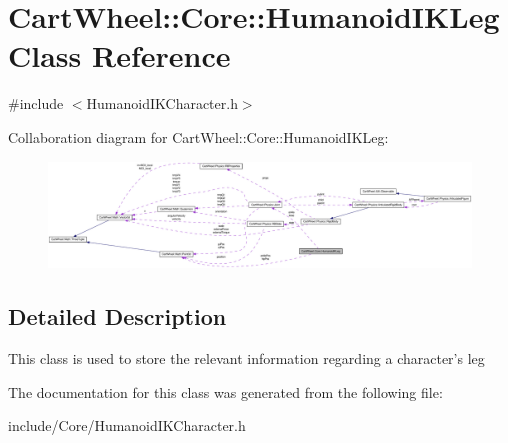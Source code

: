 \hypertarget{classCartWheel_1_1Core_1_1HumanoidIKLeg}{
\section{CartWheel::Core::HumanoidIKLeg Class Reference}
\label{classCartWheel_1_1Core_1_1HumanoidIKLeg}
}


{\ttfamily \#include $<$HumanoidIKCharacter.h$>$}



Collaboration diagram for CartWheel::Core::HumanoidIKLeg:\nopagebreak
\begin{figure}[H]
\begin{center}
\leavevmode
\includegraphics[width=400pt]{classCartWheel_1_1Core_1_1HumanoidIKLeg__coll__graph}
\end{center}
\end{figure}


\subsection{Detailed Description}
This class is used to store the relevant information regarding a character's leg 

The documentation for this class was generated from the following file:\begin{DoxyCompactItemize}
\item 
include/Core/HumanoidIKCharacter.h\end{DoxyCompactItemize}
